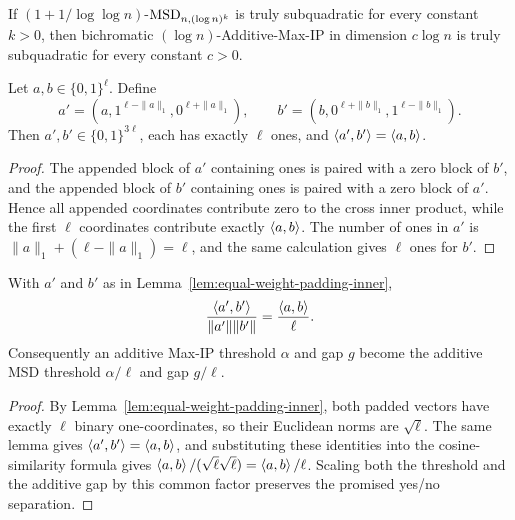 \begin{theorem}
  \label{thm:km-msd-to-additive-maxip}
  \notready
  If $(1+1/\log\log n)$-$\mathrm{MSD}_{n,(\log n)^k}$ is truly subquadratic for every
  constant $k>0$, then bichromatic $(\log n)$-Additive-Max-IP in dimension
  $c\log n$ is truly subquadratic for every constant $c>0$.
\end{theorem}

\begin{lemma}
  \label{lem:equal-weight-padding-inner}
  Let $a,b\in\{0,1\}^{\ell}$.  Define
  \[
    a'=(a,1^{\ell-\|a\|_1},0^{\ell+\|a\|_1}),\qquad
    b'=(b,0^{\ell+\|b\|_1},1^{\ell-\|b\|_1}).
  \]
  Then $a',b'\in\{0,1\}^{3\ell}$, each has exactly $\ell$ ones, and
  $\left\langle a',b'\right\rangle=\left\langle a,b\right\rangle$.
\end{lemma}
\begin{proof}
  The appended block of $a'$ containing ones is paired with a zero block of
  $b'$, and the appended block of $b'$ containing ones is paired with a zero
  block of $a'$.  Hence all appended coordinates contribute zero to the cross
  inner product, while the first $\ell$ coordinates contribute exactly
  $\left\langle a,b\right\rangle$.  The number of ones in $a'$ is
  $\|a\|_1+(\ell-\|a\|_1)=\ell$, and the same calculation gives $\ell$ ones
  for $b'$.
\end{proof}

\begin{lemma}
  \label{lem:equal-weight-padding-cosine}
  With $a'$ and $b'$ as in Lemma~\ref{lem:equal-weight-padding-inner},
  \[
    \frac{\left\langle a',b'\right\rangle}{\|a'\|\|b'\|}=\frac{\left\langle a,b\right\rangle}{\ell}.
  \]
  Consequently an additive Max-IP threshold $\alpha$ and gap $g$ become the
  additive MSD threshold $\alpha/\ell$ and gap $g/\ell$.
\end{lemma}
\begin{proof}
  By Lemma~\ref{lem:equal-weight-padding-inner}, both padded vectors have
  exactly $\ell$ binary one-coordinates, so their Euclidean norms are
  $\sqrt{\ell}$.  The same lemma gives $\left\langle a',b'\right\rangle=\left\langle a,b\right\rangle$, and substituting
  these identities into the cosine-similarity formula gives
  $\left\langle a,b\right\rangle/(\sqrt{\ell}\sqrt{\ell})=\left\langle a,b\right\rangle/\ell$.  Scaling both the
  threshold and the additive gap by this common factor preserves the promised
  yes/no separation.
\end{proof}

